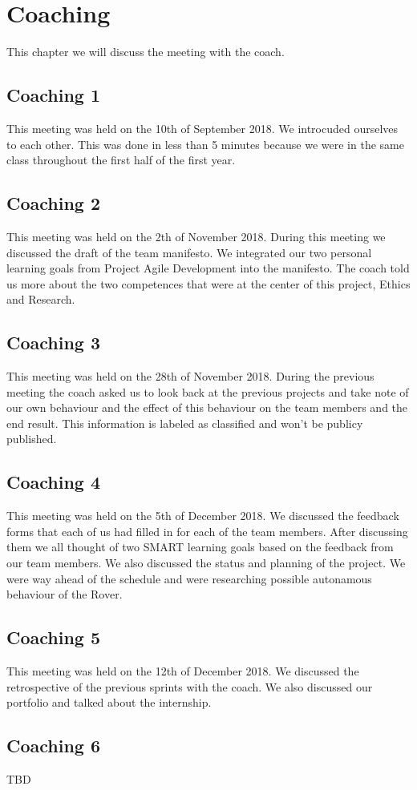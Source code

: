 \section{Coaching}
This chapter we will discuss the meeting with the coach.

\subsection{Coaching 1}
This meeting was held on the 10th of September 2018. We introcuded ourselves to each other. This was done in less than 5 minutes because we were in the same class throughout the first half of the first year.

\subsection{Coaching 2}
This meeting was held on the 2th of November 2018. During this meeting we discussed the draft of the team manifesto. We integrated our two personal learning goals from Project Agile Development into the manifesto. The coach told us more about the two competences that were at the center of this project, Ethics and Research.

\subsection{Coaching 3}
This meeting was held on the 28th of November 2018. During the previous meeting the coach asked us to look back at the previous projects and take note of our own behaviour and the effect of this behaviour on the team members and the end result. This information is labeled as classified and won't be publicy published.

\subsection{Coaching 4}
This meeting was held on the 5th of December 2018. We discussed the feedback forms that each of us had filled in for each of the team members. After discussing them we all thought of two SMART learning goals based on the feedback from our team members. We also discussed the status and planning of the project. We were way ahead of the schedule and were researching possible autonamous behaviour of the Rover.

\subsection{Coaching 5}
This meeting was held on the 12th of December 2018. We discussed the retrospective of the previous sprints with the coach. We also discussed our portfolio and talked about the internship.

\subsection{Coaching 6}
TBD
